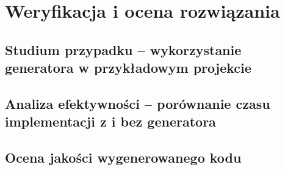 \newpage
\section{Weryfikacja i ocena rozwiązania}

\subsection{Studium przypadku – wykorzystanie generatora w przykładowym projekcie}

\subsection{Analiza efektywności – porównanie czasu implementacji z i bez generatora}

\subsection{Ocena jakości wygenerowanego kodu}
